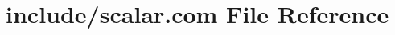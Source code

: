 \hypertarget{home_2abonfi_2_c_f_d__codes_2_eul_f_s_83_84_2include_2scalar_8com}{\section{include/scalar.com File Reference}
\label{home_2abonfi_2_c_f_d__codes_2_eul_f_s_83_84_2include_2scalar_8com}
}
